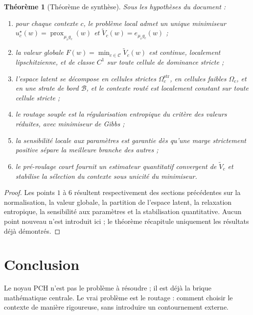 \documentclass[11pt,a4paper]{article}
\newtheorem{theorem}{Théorème}[section]
\DeclareMathOperator{\prox}{prox}
\newcommand{\Ccal}{\mathcal C}
\newcommand{\Bcal}{\mathcal B}
\begin{document}
\begin{theorem}[Théorème de synthèse]
Sous les hypothèses du document :
\begin{enumerate}[leftmargin=2em]
\item pour chaque contexte \(c\), le problème local admet un unique minimiseur \(u_c^\star(w)=\prox_{\mu_c g_c}(w)\) et \(\widetilde V_c(w)=e_{\mu_c g_c}(w)\) ;
\item la valeur globale \(F(w)=\min_{c\in\Ccal}\widetilde V_c(w)\) est continue, localement lipschitzienne, et de classe \(C^1\) sur toute cellule de dominance stricte ;
\item l'espace latent se décompose en cellules strictes \(\Omega_c^{\mathrm{str}}\), en cellules faibles \(\Omega_c\), et en une strate de bord \(\Bcal\), et le contexte routé est localement constant sur toute cellule stricte ;
\item le routage souple est la régularisation entropique du critère des valeurs réduites, avec minimiseur de Gibbs ;
\item la sensibilité locale aux paramètres est garantie dès qu'une marge strictement positive sépare la meilleure branche des autres ;
\item le pré-roulage court fournit un estimateur quantitatif convergent de \(\widetilde V_c\) et stabilise la sélection du contexte sous unicité du minimiseur.
\end{enumerate}
\end{theorem}

\begin{proof}
Les points \(1\) à \(6\) résultent respectivement des sections précédentes sur la normalisation, la valeur globale, la partition de l'espace latent, la relaxation entropique, la sensibilité aux paramètres et la stabilisation quantitative. Aucun point nouveau n'est introduit ici ; le théorème récapitule uniquement les résultats déjà démontrés.
\end{proof}

\section{Conclusion}

Le noyau PCH n'est pas le problème à résoudre ; il est déjà la brique mathématique centrale. Le vrai problème est le routage : comment choisir le contexte de manière rigoureuse, sans introduire un contournement externe.
\end{document}
